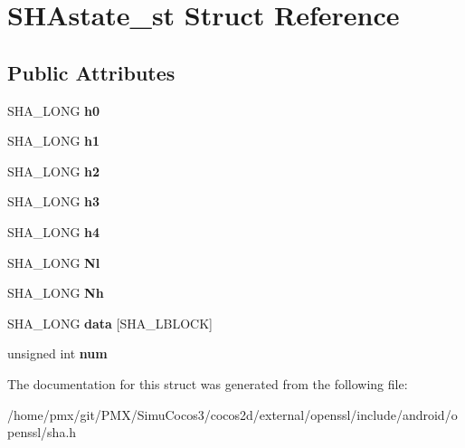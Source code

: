 \hypertarget{structSHAstate__st}{}\section{S\+H\+Astate\+\_\+st Struct Reference}
\label{structSHAstate__st}
\subsection*{Public Attributes}
\begin{DoxyCompactItemize}
\item 
\mbox{\label{structSHAstate__st_ab3041c8fb56553e66f5e96bea583181c}} 
S\+H\+A\+\_\+\+L\+O\+NG {\bfseries h0}
\item 
\mbox{\label{structSHAstate__st_aae63de503961d0e23ec45fadbf762a28}} 
S\+H\+A\+\_\+\+L\+O\+NG {\bfseries h1}
\item 
\mbox{\label{structSHAstate__st_a553b3daa14d04597c861e2482d984761}} 
S\+H\+A\+\_\+\+L\+O\+NG {\bfseries h2}
\item 
\mbox{\label{structSHAstate__st_a5219d68f2bee6867f2775d467691ad24}} 
S\+H\+A\+\_\+\+L\+O\+NG {\bfseries h3}
\item 
\mbox{\label{structSHAstate__st_abd5013d45dc77b9f31df5818e02c80d1}} 
S\+H\+A\+\_\+\+L\+O\+NG {\bfseries h4}
\item 
\mbox{\label{structSHAstate__st_abe78332975c3f20418c6a32381904bba}} 
S\+H\+A\+\_\+\+L\+O\+NG {\bfseries Nl}
\item 
\mbox{\label{structSHAstate__st_aedd943b5d71b31cb22d3a7fecf05575e}} 
S\+H\+A\+\_\+\+L\+O\+NG {\bfseries Nh}
\item 
\mbox{\label{structSHAstate__st_ac39b6e0e3b1a95a5ab1600544f4d2728}} 
S\+H\+A\+\_\+\+L\+O\+NG {\bfseries data} \mbox{[}S\+H\+A\+\_\+\+L\+B\+L\+O\+CK\mbox{]}
\item 
\mbox{\label{structSHAstate__st_a58f39bf4cf04c1f4796f6df5031bc746}} 
unsigned int {\bfseries num}
\end{DoxyCompactItemize}


The documentation for this struct was generated from the following file\+:\begin{DoxyCompactItemize}
\item 
/home/pmx/git/\+P\+M\+X/\+Simu\+Cocos3/cocos2d/external/openssl/include/android/openssl/sha.\+h\end{DoxyCompactItemize}
